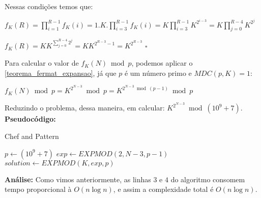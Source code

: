 Nessas condições temos que: 

$f_K(R) = \prod_{i=1}^{R-1}f_K(i) = 1.K.\prod_{i=3}^{R-1}f_K(i) = K\prod_{i=3}^{R-1}K^{2^{i-3}} = K\prod_{j=0}^{R-4}K^{2^j}$

$f_K(R) = KK^{\sum_{j=0}^{R-4}2^j} = KK^{2^{R-3}-1} = K^{2^{R-3}}$ $\square$

Para calcular o valor de $f_K(N) \bmod p$, podemos aplicar o \autoref{teorema_fermat_expansao}, já que $p$ é um número primo e $MDC(p, K) = 1$:

$f_K(N) \bmod p = K^{2^{N-3}} \bmod p = K^{2^{N-3} \bmod (p-1)} \bmod p$ 

Reduzindo o problema, dessa maneira, em calcular: $K^{2^{N-3}} \bmod (10^9+7)$.
\\

\textbf{Pseudocódigo:}
\begin{algorithm}
\caption{Chef and Pattern}
\begin{algorithmic}[1]
\State $p \gets (10^9+7)$
\State $exp \gets EXPMOD(2, N-3, p-1)$ 
\State $solution \gets EXPMOD(K, exp, p)$ 
\State {}
\EndProcedure
\end{algorithmic}
\end{algorithm}

\textbf{Análise:}
Como vimos anteriormente, as linhas $3$ e $4$ do algoritmo consomem tempo proporcional à $O(n \log n)$, e assim a complexidade total é $O(n \log n)$.

